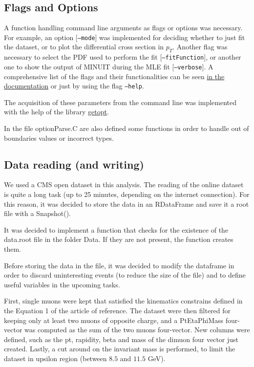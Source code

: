 \documentclass{article}
\begin{document}
\subsection{Flags and Options}
A function handling command line arguments as flags or options was necessary. For example, an option [\texttt{--mode}] was implemented for deciding whether to just fit the dataset, or to plot the differential cross section in $p_T$. Another flag was necessary to select the PDF used to perform the fit [\texttt{--fitFunction}], or another one to show the output of MINUIT during the MLE fit [\texttt{--verbose}]. A comprehensive list of the flags and their functionalities can be seen  \href{https://zenith378.github.io/Y-DiMuonResonances/html/optionParse_8h.html#ae964ff8411b4fdcaf65cb5529aea4bef}{in the documentation} or just by using the flag \texttt{--help}.

The acquisition of these parameters from the command line was implemented with the help of the library \href{https://man7.org/linux/man-pages/man3/getopt.3.html}{getopt}.

In the file optionParse.C are also defined some functions in order to handle out of boundaries values or incorrect types.

\subsection{Data reading (and writing)}
We used a CMS open dataset in this analysis. The reading of the online dataset is quite a long task (up to 25 minutes, depending on the internet connection). For this reason, it was decided to store the data in an RDataFrame and save it a root file with a Snapshot().


It was decided to implement a function that checks for the existence of the data.root file in the folder Data. If they are not present, the function creates them.

Before storing the data in the file, it was decided to modify the dataframe in order to discard uninteresting events (to reduce the size of the file) and to define useful variables in the upcoming tasks.

First, single muons were kept that satisfied the kinematics constrains defined in the Equation 1 of the article of reference. The dataset were then filtered for keeping only at least two muons of opposite charge, and a PtEtaPhiMass four-vector was computed as the sum of the two muons four-vector. New columns were defined, such as the pt, rapidity, beta and mass of the dimuon four vector just created. Lastly, a cut around on the invariant mass is performed, to limit the dataset in upsilon region (between $8.5$ and $11.5$ GeV).
\end{document}
